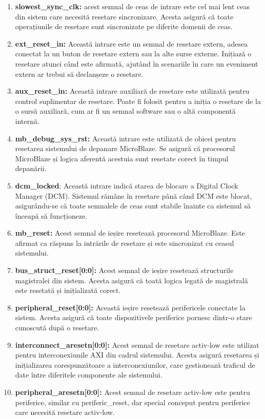 \documentclass[12pt]{article}
\begin{document}
\begin{enumerate}
    \item \textbf{slowest\_sync\_clk:} acest semnal de ceas de intrare este cel mai lent ceas din sistem care necesită resetare sincronizare. Acesta asigură că toate operațiunile de resetare sunt sincronizate pe diferite domenii de ceas.
    \item \textbf{ext\_reset\_in:} Această intrare este un semnal de resetare extern, adesea conectat la un buton de resetare extern sau la alte surse externe. Inițiază o resetare atunci când este afirmată, ajutând în scenariile în care un eveniment extern ar trebui să declanșeze o resetare.
    \item \textbf{aux\_reset\_in:} Această intrare auxiliară de resetare este utilizată pentru control suplimentar de resetare. Poate fi folosit pentru a iniția o resetare de la o sursă auxiliară, cum ar fi un semnal software sau o altă componentă internă.
    \item \textbf{mb\_debug\_sys\_rst:} Această intrare este utilizată de obicei pentru resetarea sistemului de depanare MicroBlaze. Se asigură că procesorul MicroBlaze și logica aferentă acestuia sunt resetate corect în timpul depanării.
    \item \textbf{dcm\_locked}: Această intrare indică starea de blocare a Digital Clock Manager (DCM). Sistemul rămâne în resetare până când DCM este blocat, asigurându-se că toate semnalele de ceas sunt stabile înainte ca sistemul să înceapă să funcționeze.
    \item \textbf{mb\_reset:} Acest semnal de ieșire resetează procesorul MicroBlaze. Este afirmat ca răspuns la intrările de resetare și este sincronizat cu ceasul sistemului.
    \item \textbf{bus\_struct\_reset[0:0]:} Acest semnal de ieșire resetează structurile magistralei din sistem. Acesta asigură că toată logica legată de magistrală este resetată și inițializată corect.
    \item \textbf{peripheral\_reset[0:0]:} Această ieșire resetează perifericele conectate la sistem. Acesta asigură că toate dispozitivele periferice pornesc dintr-o stare cunoscută după o resetare.
    \item \textbf{interconnect\_aresetn[0:0]:} Acest semnal de resetare activ-low este utilizat pentru interconexiunile AXI din cadrul sistemului. Acesta asigură resetarea și inițializarea corespunzătoare a interconexiunilor, care gestionează traficul de date între diferitele componente ale sistemului.
    \item \textbf{peripheral\_aresetn[0:0]:} Acest semnal de resetare activ-low este pentru periferice, similar cu periferic\_reset, dar special conceput pentru periferice care necesită resetare activ-low.
\end{enumerate}
\end{document}
